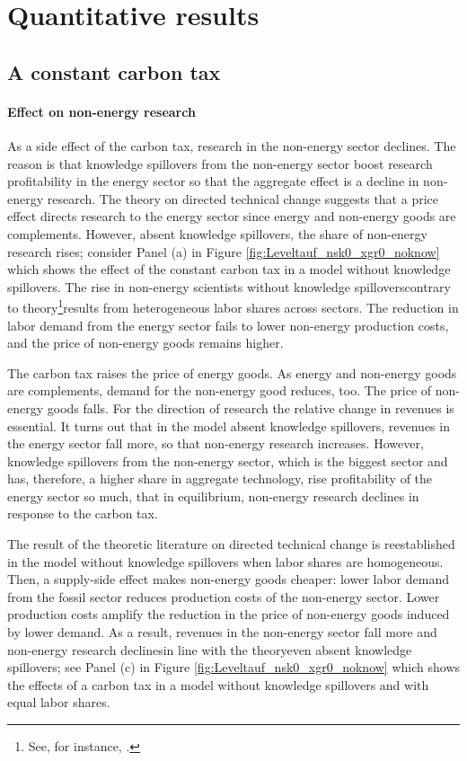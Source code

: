 
\section{Quantitative results}\label{app:quant_res2}
\subsection{A constant carbon tax}\label{app:polexp_cc}

\paragraph{Effect on non-energy research}
As a side effect of the carbon tax, research in the non-energy sector declines. 
The reason is that knowledge spillovers from the non-energy sector boost research profitability in the energy sector so that the aggregate effect is a decline in non-energy research. The theory on directed technical change suggests that a price effect directs research to the energy sector since energy and non-energy goods are complements.  However, absent knowledge spillovers, the share of non-energy research rises; consider Panel (a) in Figure \ref{fig:Leveltauf_nsk0_xgr0_noknow} which shows the effect of the constant carbon tax in a model without knowledge spillovers. The rise in non-energy scientists without knowledge spillovers\textemdash contrary to  theory\footnote{ See, for instance,  \cite{Hemous2021DirectedEconomics}.}\textemdash results from heterogeneous labor shares across sectors. The reduction in labor demand from the energy sector fails to lower non-energy production costs, and the price of non-energy goods remains higher. 

The carbon tax raises the price of energy goods. As energy and non-energy goods are complements, demand for the non-energy good reduces, too. The price of non-energy goods falls. For the direction of research the relative change in revenues is essential. 
It turns out that in the model absent knowledge spillovers, revenues in the energy sector fall more, so that non-energy research increases. However, knowledge spillovers from the non-energy sector, which is the biggest sector and has, therefore, a higher share in aggregate technology, rise profitability of the energy sector so much, that in equilibrium, non-energy research declines in response to the carbon tax. 

The result of the theoretic literature on directed technical change is reestablished in the model without knowledge spillovers when labor shares are homogeneous. Then, a supply-side effect makes non-energy goods  cheaper: lower labor demand from the fossil sector reduces production costs of the non-energy sector. Lower production costs amplify the reduction in the price of non-energy goods induced by lower demand.  As a result, revenues in the non-energy sector fall more and non-energy research declines\textemdash in line with the theory\textemdash even absent knowledge spillovers; see Panel (c) in Figure \ref{fig:Leveltauf_nsk0_xgr0_noknow} which shows the effects of a carbon tax in a model without knowledge spillovers and with equal labor shares. 

